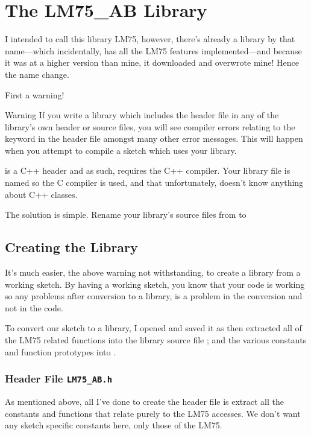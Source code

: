 \chapter{The LM75\_AB Library}

I intended to call this library LM75, however, there's already a library by that name---which incidentally, has all the LM75 features implemented---and because it was at a higher version than mine, it downloaded and overwrote mine! Hence the name change.

First a warning!

\begin{tips}{Warning}
    If you write a library which includes the  header file in any of the library's own header or source files, you will see compiler errors relating to the  keyword in the header file  amongst many other error messages. This will happen when you attempt to compile a sketch which uses your library.

     is a C++ header and as such, requires the C++ compiler. Your library file is named  so the C compiler is used, and that unfortunately, doesn't know anything about C++ classes.

    The solution is simple. Rename your library's source files from  to 
\end{tips}

\section{Creating the Library}

It's much easier, the above warning not withstanding, to create a library from a working sketch. By having a working sketch, you know that your code is working so any problems after conversion to a library, is a problem in the conversion and not in the code.

To convert our sketch to a library, I opened  and saved it as  then extracted all of the LM75 related functions into the library source file ; and the various constants and function prototypes into .

\subsection{Header File \texttt{LM75\_AB.h}}

As mentioned above, all I've done to create the header file is extract all the constants and functions that relate purely to the LM75 accesses. We don't want any sketch specific constants here, only those of the LM75.

